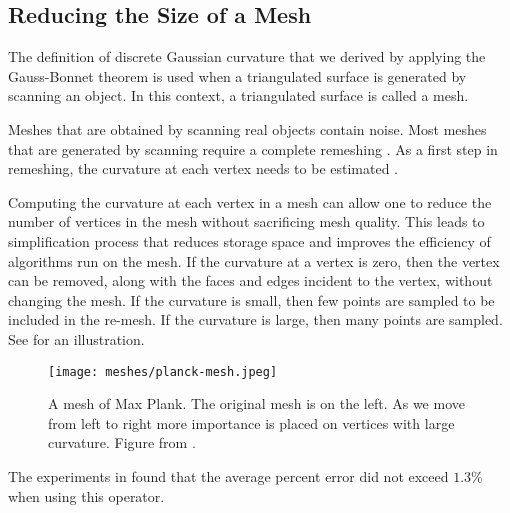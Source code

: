 \subsection{Reducing the Size of a Mesh}
\label{sec:removing}

The definition of discrete Gaussian curvature that we
derived by applying the Gauss-Bonnet theorem is used when 
a triangulated surface is generated by scanning an object.
In this context, a triangulated surface is called a mesh.

Meshes that are obtained by scanning real objects contain noise.
Most meshes that are generated by scanning require a complete
remeshing \cite{remeshing-2003}.
As a first step in remeshing, the curvature at each
vertex needs to be estimated \cite{mmsb-2003}.




Computing the curvature at each vertex in a mesh can allow one to reduce
the number of vertices in the mesh without sacrificing mesh quality.
This leads to simplification process that reduces storage space and improves the efficiency of
 algorithms run on the mesh.
If the curvature at a vertex is zero, then the vertex can be removed,
along with the faces and edges incident to the vertex, without changing 
the mesh.
 If the curvature is small, then few points
are sampled to be included in the re-mesh. If the curvature
is large, then many points are sampled. See 
for an illustration.

\begin{figure}[htb]
\centering
\texttt{[image: meshes/planck-mesh.jpeg]}
\caption{A mesh of Max Plank. The original mesh is on the left. As we move
from left to right more importance is placed on vertices with large curvature.
Figure from \cite{alliez-2002}.}
\label{fig:planck-mesh}
\end{figure}


The experiments in \cite{mmsb-2003} found that the average
percent error did not exceed $1.3\%$ when using this operator.

